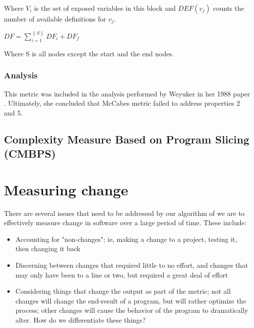 \documentclass[]{article}
\begin{document}
Where $V_i$ is the set of exposed variables in this block and $DEF(v_j)$ counts the number of available definitions for $v_j$.

$DF = \sum\limits_{i=1}^{\parallel S \parallel} DF_i+DF_f$

Where S is all nodes except the start and the end nodes.

\subsubsection{Analysis}

This metric was included in the analysis performed by Weyuker in her 1988 paper \cite{ref:evaluating_software_complexity_measures}.
Ultimately, she concluded that McCabes metric failed to address properties 2 and 5.

\subsection{Complexity Measure Based on Program Slicing (CMBPS)}

\cite{ref:tao2014complexity}

\section{Measuring change}




There are several issues that need to be addressed by our algorithm of we are to effectively measure change in software over a large period of time.
These include:
\begin{itemize}
	\item Accounting for "non-changes"; ie, making a change to a project, testing it, then changing it back
	\item Discerning between changes that required little to no effort, and changes that may only have been to a line or two, but required a great deal of effort
	\item Considering things that change the output as part of the metric; not all changes will change the end-result of a program, but will rather optimize the process; other changes will cause the behavior of the program to dramatically alter. How do we differentiate these things?
\end{itemize}
\end{document}
